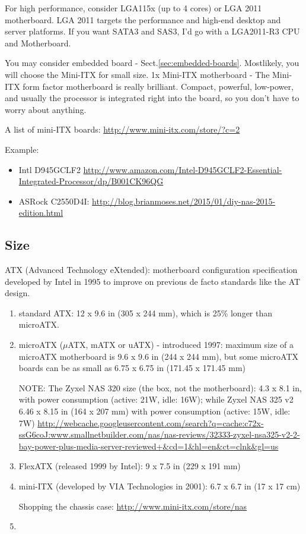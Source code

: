 For high performance, consider LGA115x (up to 4 cores) or LGA 2011 motherboard.
LGA 2011 targets the performance and high-end desktop and server platforms.
If you want SATA3 and SAS3, I’d go with a LGA2011-R3 CPU and Motherboard.


You may consider embedded board - Sect.\ref{sec:embedded-boards}.
Mostlikely, you will choose the Mini-ITX for small size.
1x Mini-ITX motherboard - The Mini-ITX form factor motherboard is really
brilliant. Compact, powerful, low-power, and usually the processor is integrated
right into the board, so you don't have to worry about anything. 

A list of mini-ITX boards:
\url{http://www.mini-itx.com/store/?c=2}

Example:
\begin{itemize}
  \item Intl D945GCLF2
\url{http://www.amazon.com/Intel-D945GCLF2-Essential-Integrated-Processor/dp/B001CK96QG}

  \item  ASRock C2550D4I:
\url{http://blog.brianmoses.net/2015/01/diy-nas-2015-edition.html}
\end{itemize}


\subsection{Size}


ATX (Advanced Technology eXtended): motherboard configuration specification
developed by Intel in 1995 to improve on previous de facto standards like the AT
design.

\begin{enumerate}
  \item standard ATX: 12 x 9.6 in (305 x 244 mm), which is 25\% longer than
  microATX.
  
  \item microATX ($\mu$ATX, mATX or uATX) - introduced 1997:
  maximum size of a microATX motherboard is 9.6 x 9.6 in (244 x 244 mm), but
  some microATX boards can be as small as 6.75 x 6.75 in (171.45 x 171.45 mm)
  
NOTE: The Zyxel NAS 320 size (the box, not the motherboard): 4.3 x 8.1 in,
with power consumption (active: 21W, idle: 16W); while Zyxel NAS 325 v2 
6.46 x 8.15 in (164 x 207 mm) with power consumption (active: 15W, idle: 7W)
\url{http://webcache.googleusercontent.com/search?q=cache:c72x-ssG6coJ:www.smallnetbuilder.com/nas/nas-reviews/32333-zyxel-nsa325-v2-2-bay-power-plus-media-server-reviewed+&cd=1&hl=en&ct=clnk&gl=us}

  \item FlexATX (released 1999 by Intel):  9 x 7.5 in (229 x 191 mm)   
  
  \item mini-ITX (developed by VIA Technologies in 2001): 6.7 x 6.7 in (17 x 17
  cm)

Shopping the chassis case: \url{http://www.mini-itx.com/store/nas}
  
  \item  
\end{enumerate}

